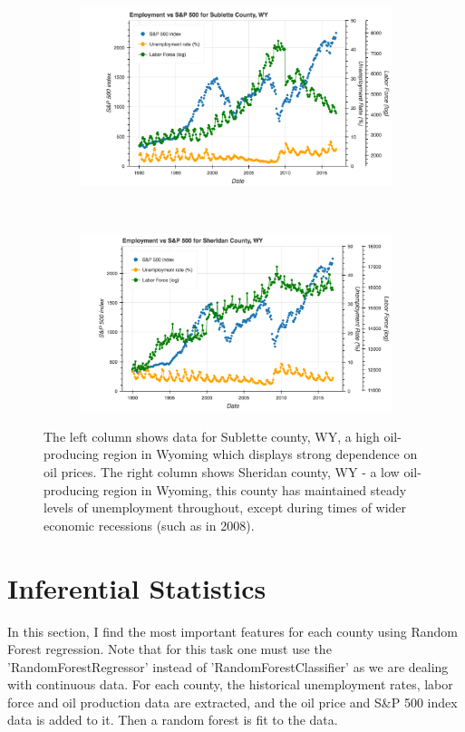 \documentclass[11pt,letterpaper]{article}
\begin{document}
\begin{figure}
\begin{subfigure}{0.45\textwidth}
\includegraphics[width=1.1\linewidth]{wy_sublette_snp}
\end{subfigure}
~
\begin{subfigure}{0.45\textwidth}
\includegraphics[width=1.1\linewidth]{wy_sheridan_snp}
\end{subfigure}

\caption{The left column shows data for Sublette county, WY, a high oil-producing region in Wyoming which displays strong dependence on oil prices. The right column shows Sheridan county, WY - a low oil-producing region in Wyoming, this county has maintained steady levels of unemployment throughout, except during times of wider economic recessions (such as in 2008).}
\label{fig:wy_hist_data}
\end{figure}

\section{Inferential Statistics}

In this section, I find the most important features for each county using Random Forest regression. Note that for this task one must use the 'RandomForestRegressor' instead of 'RandomForestClassifier' as we are dealing with continuous data. For each county, the historical unemployment rates, labor force and oil production data are extracted, and the oil price and S\&P 500 index data is added to it. Then a random forest is fit to the data.
\end{document}
